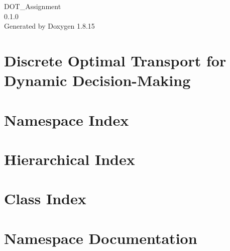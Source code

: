 \let\mypdfximage\pdfximage\def\pdfximage{\immediate\mypdfximage}\documentclass[twoside]{book}
\newcommand{\+}{\discretionary{\mbox{\scriptsize$\hookleftarrow$}}{}{}}
\newcommand{\clearemptydoublepage}{%
  \newpage{\pagestyle{empty}\cleardoublepage}%
}
\begin{document}
\hypersetup{pageanchor=false,
             bookmarksnumbered=true,
             pdfencoding=unicode
            }
\begin{titlepage}
\vspace*{7cm}
\begin{center}%
{\Large D\+O\+T\+\_\+\+Assignment \\[1ex]\large 0.\+1.\+0 }\\
\vspace*{1cm}
{\large Generated by Doxygen 1.8.15}\\
\end{center}
\end{titlepage}
\clearemptydoublepage
{}
\tableofcontents
\clearemptydoublepage
{}
\hypersetup{pageanchor=true}

\chapter{Discrete Optimal Transport for Dynamic Decision-\/\+Making}
\label{index}\hypertarget{index}{}
\chapter{Namespace Index}

\chapter{Hierarchical Index}

\chapter{Class Index}

\chapter{Namespace Documentation}












\end{document}
